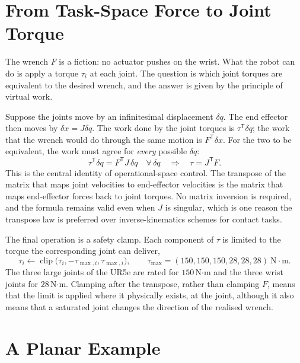 \documentclass{article}
\newcommand{\T}{\mathsf{T}}
\begin{document}
\section{From Task-Space Force to Joint Torque}
\label{sec:transpose}

The wrench $F$ is a fiction: no actuator pushes on the wrist. What the robot can do is apply a torque $\tau_i$ at each joint. The question is which joint torques are equivalent to the desired wrench, and the answer is given by the principle of virtual work.

Suppose the joints move by an infinitesimal displacement $\delta q$. The end effector then moves by $\delta x=J\delta q$. The work done by the joint torques is $\tau^\T\delta q$; the work that the wrench would do through the same motion is $F^\T\delta x$. For the two to be equivalent, the work must agree for \emph{every} possible $\delta q$:
\begin{equation}
  \tau^\T\delta q = F^\T J\,\delta q\quad\forall\,\delta q
  \quad\Longrightarrow\quad
  \tau = J^\T F.
  \label{eq:transpose}
\end{equation}
This is the central identity of operational-space control. The transpose of the matrix that maps joint velocities to end-effector velocities is the matrix that maps end-effector forces back to joint torques. No matrix inversion is required, and the formula remains valid even when $J$ is singular, which is one reason the transpose law is preferred over inverse-kinematics schemes for contact tasks.

The final operation is a safety clamp. Each component of $\tau$ is limited to the torque the corresponding joint can deliver,
\begin{equation}
  \tau_i \leftarrow \operatorname{clip}\big(\tau_i,-\tau_{\max,i},\tau_{\max,i}\big), \qquad
  \tau_{\max} = (150,150,150,28,28,28)\ \mathrm{N\cdot m}.
\end{equation}
The three large joints of the UR5e are rated for $150$\,N$\cdot$m and the three wrist joints for $28$\,N$\cdot$m. Clamping after the transpose, rather than clamping $F$, means that the limit is applied where it physically exists, at the joint, although it also means that a saturated joint changes the direction of the realised wrench.

\section{A Planar Example}
\label{sec:planar}
\end{document}
